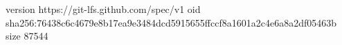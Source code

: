 version https://git-lfs.github.com/spec/v1
oid sha256:76438c6c4679e8b17ea9e3484dcd5915655ffccf8a1601a2c4e6a8a2df05463b
size 87544
